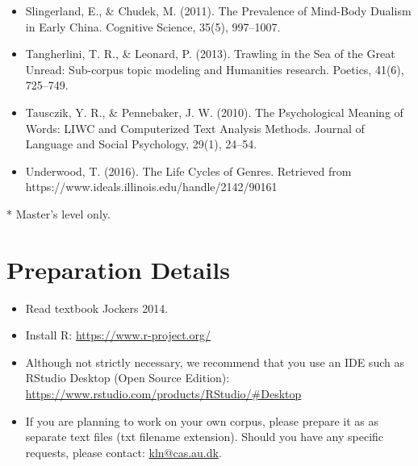\documentclass[12pt,a4paper]{article}
\begin{document}
\begin{itemize}
\item Slingerland, E., \& Chudek, M. (2011). The Prevalence of Mind-Body Dualism in Early China. Cognitive Science, 35(5), 997–1007.
\item Tangherlini, T. R., \& Leonard, P. (2013). Trawling in the Sea of the Great Unread: Sub-corpus topic modeling and Humanities research. Poetics, 41(6), 725–749.
\item Tausczik, Y. R., \& Pennebaker, J. W. (2010). The Psychological Meaning of Words: LIWC and Computerized Text Analysis Methods. Journal of Language and Social Psychology, 29(1), 24–54.
\item Underwood, T. (2016). The Life Cycles of Genres. Retrieved from https://www.ideals.illinois.edu/handle/2142/90161

\end{itemize}
{\scriptsize ** Master's level only.}
\section*{\hypertarget{prep_det}{Preparation Details}}
\begin{itemize}
\item Read textbook Jockers 2014.
\item Install R: \url{https://www.r-project.org/}
\item Although not strictly necessary, we recommend that you use an IDE such as RStudio Desktop (Open Source Edition): \url{https://www.rstudio.com/products/RStudio/#Desktop}
\item If you are planning to work on your own corpus, please prepare it as as separate text files (txt filename extension). Should you have any specific requests, please contact: \href{mailto:kln@cas.au.dk}{kln@cas.au.dk}. 
\end{itemize}
\end{document}
